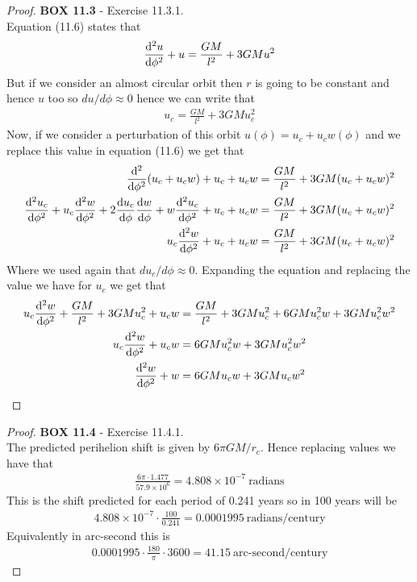 \documentclass[11pt]{article}
\theoremstyle{definition}
\begin{document}
\begin{proof}{\textbf{BOX 11.3} - Exercise 11.3.1.}\\
    Equation (11.6) states that
    \begin{align*}
        \dv[2]{u}{\phi} + u = \frac{GM}{l^2} + 3GMu^2
    \end{align*}
    But if we consider an almost circular orbit then $r$ is going to be constant
    and hence $u$ too so $du/d\phi \approx 0$ hence we can write that
    \begin{align*}
        u_c = \frac{GM}{l^2} + 3GMu_c^2
    \end{align*}
    Now, if we consider a perturbation of this orbit
    $u(\phi) = u_c + u_cw(\phi)$ and we replace this value in equation (11.6)
    we get that
    \begin{align*}
        \dv[2]{\phi}(u_c + u_cw) + u_c + u_cw
        &= \frac{GM}{l^2} + 3GM(u_c + u_cw)^2\\
        \dv[2]{u_c}{\phi} + u_c\dv[2]{w}{\phi} 
        + 2 \dv{u_c}{\phi}\dv{w}{\phi} + w\dv[2]{u_c}{\phi}
        + u_c + u_cw &= \frac{GM}{l^2} + 3GM(u_c + u_cw)^2\\
        u_c\dv[2]{w}{\phi} + u_c + u_cw
        &= \frac{GM}{l^2} + 3GM(u_c + u_cw)^2
    \end{align*}
    Where we used again that $du_c/d\phi \approx 0$.
    Expanding the equation and replacing the value we have for $u_c$ we get
    that
    \begin{align*}
        u_c\dv[2]{w}{\phi} + \frac{GM}{l^2} + 3GMu_c^2 + u_cw
        &= \frac{GM}{l^2} + 3GMu_c^2 + 6GMu_c^2w + 3GMu_c^2w^2\\
        u_c\dv[2]{w}{\phi} + u_cw &= 6GMu_c^2w + 3GMu_c^2w^2\\
        \dv[2]{w}{\phi} + w &= 6GMu_cw + 3GMu_cw^2
    \end{align*}
\end{proof}
\begin{proof}{\textbf{BOX 11.4} - Exercise 11.4.1.}\\
    The predicted perihelion shift is given by
    $6\pi GM/r_c$.
    Hence replacing values we have that
    \begin{align*}
        \frac{6\pi\cdot 1.477}{57.9\times 10^6} 
        = 4.808\times 10^{-7}~\text{radians} 
    \end{align*}
    This is the shift predicted for each period of 0.241 years so in 100 years
    will be 
    \begin{align*}
        4.808\times 10^{-7} \cdot \frac{100}{0.241}
        = 0.0001995~\text{radians/century}
    \end{align*}
    Equivalently in arc-second this is
    \begin{align*}
        0.0001995\cdot \frac{180}{\pi} \cdot 3600
        = 41.15~\text{arc-second/century}
    \end{align*}
\end{proof}
\end{document}
